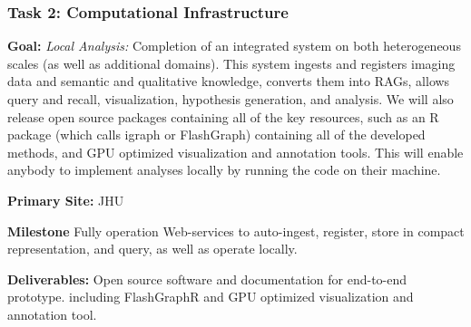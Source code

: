 

\subsubsection{Task 2: Computational Infrastructure}
\begin{compactitem}
\item \textbf{Goal:} \emph{Local Analysis:} Completion of an integrated system on both heterogeneous scales (as well as additional domains).  This system ingests and registers imaging data and semantic and qualitative knowledge, converts them into RAGs, allows query and recall, visualization, hypothesis generation, and analysis. We will also release open source packages containing all of the key resources, such as an R package (which calls igraph or FlashGraph) containing all of the developed methods, and GPU optimized visualization and annotation tools. This will enable anybody to implement analyses locally by running the code on their machine.
\item \textbf{Primary Site:} JHU
\item \textbf{Milestone} Fully operation Web-services to auto-ingest, register, store in compact representation, and query, as well as operate locally.
\item \textbf{Deliverables:} Open source software and documentation for end-to-end prototype. including FlashGraphR and GPU optimized visualization and annotation tool.
\end{compactitem}


